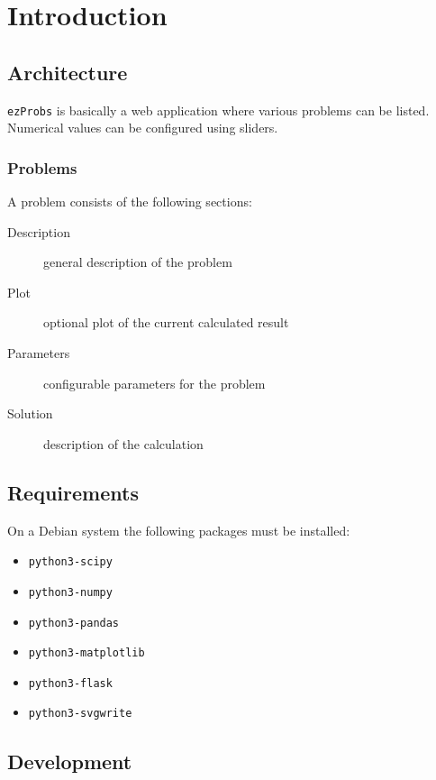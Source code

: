 \section{Introduction}

\subsection{Architecture}

\verb+ezProbs+ is basically a web application where various problems can be listed.
Numerical values can be configured using sliders.

\subsubsection{Problems}

A problem consists of the following sections:

\begin{description}
  \item[Description] general description of the problem
  \item[Plot] optional plot of the current calculated result
  \item[Parameters] configurable parameters for the problem
  \item[Solution] description of the calculation
\end{description}

\subsection{Requirements}

On a Debian system the following packages must be installed:

\begin{itemize}
  \item \verb+python3-scipy+
  \item \verb+python3-numpy+
  \item \verb+python3-pandas+
  \item \verb+python3-matplotlib+
  \item \verb+python3-flask+
  \item \verb+python3-svgwrite+
\end{itemize}

\subsection{Development}

